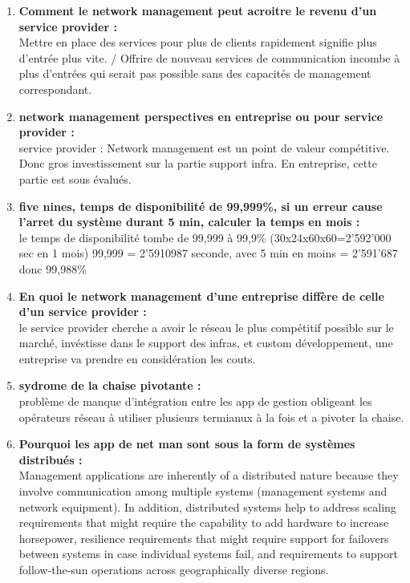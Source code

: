 \documentclass[12pt,landscape]{article}
\begin{document}
\begin{multicols}{2}
\begin{enumerate}
\item \textbf{Comment le network management peut acroitre le revenu d'un service provider : }\\
Mettre en place des services pour plus de clients rapidement signifie plus d'entrée plus vite. / Offrire de nouveau services de communication incombe à plus d'entrées qui serait pas possible sans des capacités de management correspondant.

\item \textbf{network management perspectives en entreprise ou pour service provider :}\\
service provider : Network management est un point de valeur compétitive. Donc gros investissement sur la partie support infra. En entreprise, cette partie est sous évalués. 

\item \textbf{ five nines, temps de disponibilité de 99,999\%, si un erreur cause l'arret du système durant 5 min, calculer la temps en mois :}\\
le temps de disponibilité tombe de 99,999 à 99,9\% (30x24x60x60=2'592'000 sec en 1 mois) 99,999 = 2'5910987 seconde, avec 5 min en moins = 2'591'687 donc 99,988\%

\item \textbf{En quoi le network management d'une entreprise diffère de celle d'un service provider :}\\
le service provider cherche a avoir le réseau le plus compétitif possible sur le marché, invéstisse dans le support des infras, et custom développement, une entreprise va prendre en considération les couts.

\item \textbf{sydrome de la chaise pivotante : }\\
problème de manque d'intégration entre les app de gestion obligeant les opérateurs réseau à utiliser plusieurs termianux à la fois et a pivoter la chaise.

\item \textbf{Pourquoi les app de net man sont sous la form de systèmes distribués :}\\
Management applications are inherently of a distributed nature because they involve
communication among multiple systems (management systems and network equipment). In
addition, distributed systems help to address scaling requirements that might require the
capability to add hardware to increase horsepower, resilience requirements that might require
support for failovers between systems in case individual systems fail, and requirements to
support follow-the-sun operations across geographically diverse regions.



\end{enumerate}
\end{multicols}
\end{document}
